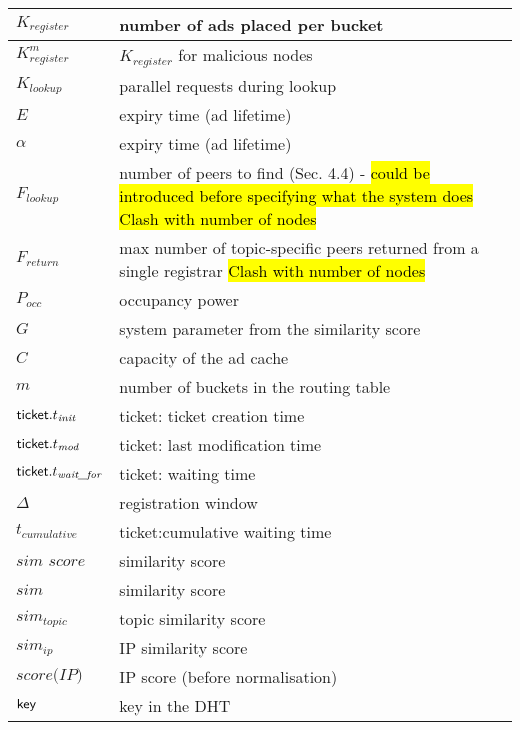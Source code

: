 \begin{table*}
\begin{center}
\begin{tabular}{ | l | p{16cm} |}
      $K_{\textit{register}}$ & number of ads placed per bucket\\ \hline
      $K^m_{\textit{register}}$ & $K_{\textit{register}}$ for malicious nodes \\ \hline
      $K_{\textit{lookup}}$ & parallel requests during lookup\\ \hline
      $E$ & expiry time (ad lifetime) \\ \hline
      $\alpha$ & expiry time (ad lifetime) \\ \hline
      $F_{\textit{lookup}}$ & number of peers to find (Sec. 4.4) - \hl{could be introduced before specifying what the system does}  \hl{Clash with number of nodes} \\ \hline
      $F_{\textit{return}}$ & max number of topic-specific peers returned from a single registrar \hl{Clash with number of nodes} \\ \hline
      $P_\textit{occ}$ & occupancy power \\ \hline
      $G$ & system parameter from the similarity score \\ \hline
      $C$ & capacity of the ad cache \\ \hline
      $m$ & number of buckets in the routing table \\ \hline

      $\mathsf{ticket}.t_{\textit{init}}$ & ticket: ticket creation time \\ \hline
      $\mathsf{ticket}.t_{\textit{mod}}$ & ticket: last modification time \\ \hline
      $\mathsf{ticket}.t_{\textit{wait\_for}}$ & ticket: waiting time \\ \hline
      $\Delta$ & registration window\\ \hline
      $t_{\textit{cumulative}}$ & ticket:cumulative waiting time \\ \hline

      $\textit{sim score}$ & similarity score \\ \hline
      $\textit{sim}$ & similarity score \\ \hline
      $\textit{sim}_\textit{topic}$ & topic similarity score \\ \hline
      $\textit{sim}_{ip}$ & IP similarity score \\ \hline
      $\textit{score(IP)}$ & IP score (before normalisation) \\ \hline


      $\mathsf{key}$ & key in the DHT \\ \hline
    \hline
  \end{tabular}
\end{center}
\end{table*}

